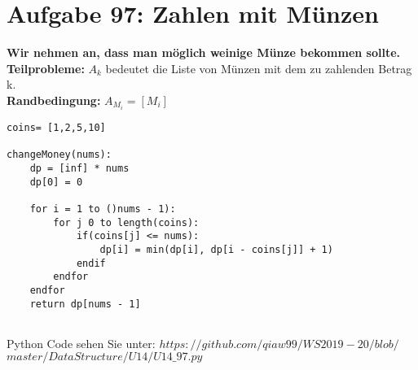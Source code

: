\documentclass{article}
\begin{document}
\section{Aufgabe 97: Zahlen mit Münzen}
\textbf{Wir nehmen an, dass man möglich weinige Münze bekommen sollte.} \\ 
\textbf{Teilprobleme:} $A_k$ bedeutet die Liste von Münzen mit dem zu zahlenden Betrag k. \\
\textbf{Randbedingung:} $A_{M_i} = [M_i]$\\
\begin{lstlisting}
coins= [1,2,5,10]

changeMoney(nums):
	dp = [inf] * nums
	dp[0] = 0
	
	for i = 1 to ()nums - 1):
		for j 0 to length(coins):
			if(coins[j] <= nums):
				dp[i] = min(dp[i], dp[i - coins[j]] + 1)
			endif
		endfor
	endfor           
	return dp[nums - 1]
	
\end{lstlisting}
Python Code sehen Sie unter: $https://github.com/qiaw99/WS2019-20/blob/$\\$master/DataStructure/U14/U14\_97.py$
\end{document}
